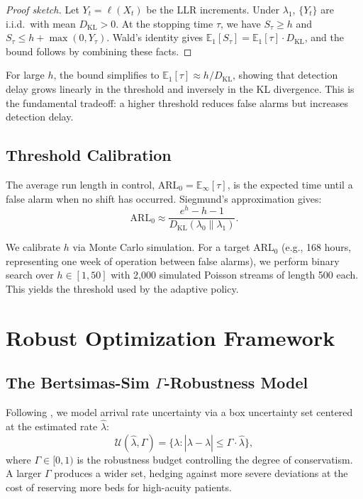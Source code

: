 \documentclass[11pt,twocolumn]{article}
\theoremstyle{plain}
\theoremstyle{definition}
\begin{document}
\begin{proof}[Proof sketch]
Let $Y_t = \ell(X_t)$ be the LLR increments. Under $\lambda_1$, $\{Y_t\}$ are i.i.d.\ with mean $D_{\text{KL}} > 0$. At the stopping time $\tau$, we have $S_\tau \ge h$ and $S_\tau \le h + \max(0, Y_\tau)$. Wald's identity gives $\mathbb{E}_1[S_\tau] = \mathbb{E}_1[\tau] \cdot D_{\text{KL}}$, and the bound follows by combining these facts.
\end{proof}

For large $h$, the bound simplifies to $\mathbb{E}_1[\tau] \approx h / D_{\text{KL}}$, showing that detection delay grows linearly in the threshold and inversely in the KL divergence. This is the fundamental tradeoff: a higher threshold reduces false alarms but increases detection delay.

\subsection{Threshold Calibration}

The average run length in control, $\text{ARL}_0 = \mathbb{E}_\infty[\tau]$, is the expected time until a false alarm when no shift has occurred. Siegmund's approximation \cite{siegmund1985sequential} gives:
\begin{equation}
\text{ARL}_0 \approx \frac{e^{h} - h - 1}{D_{\text{KL}}(\lambda_0 \parallel \lambda_1)}.
\label{eq:arl0}
\end{equation}

We calibrate $h$ via Monte Carlo simulation. For a target $\text{ARL}_0$ (e.g., 168 hours, representing one week of operation between false alarms), we perform binary search over $h \in [1, 50]$ with 2,000 simulated Poisson streams of length 500 each. This yields the threshold used by the adaptive policy.

\section{Robust Optimization Framework}

\subsection{The Bertsimas-Sim $\Gamma$-Robustness Model}

Following \citet{bertsimas2004price}, we model arrival rate uncertainty via a box uncertainty set centered at the estimated rate $\hat{\lambda}$:
\begin{equation}
\mathcal{U}(\hat{\lambda}, \Gamma) = \{\lambda : |\lambda - \hat{\lambda}| \le \Gamma \cdot \hat{\lambda} \},
\label{eq:uncertainty}
\end{equation}
where $\Gamma \in [0, 1)$ is the robustness budget controlling the degree of conservatism. A larger $\Gamma$ produces a wider set, hedging against more severe deviations at the cost of reserving more beds for high-acuity patients.
\end{document}
